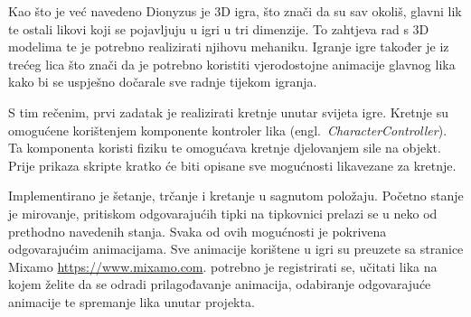 Kao što je već navedeno Dionyzus je 3D igra, što znači da su sav okoliš, glavni lik
te ostali likovi koji se pojavljuju u igri u tri dimenzije. To zahtjeva rad s 3D
modelima te je potrebno realizirati njihovu mehaniku.
Igranje igre također je iz trećeg lica što znači da je potrebno koristiti
vjerodostojne animacije glavnog lika kako bi se uspješno dočarale sve radnje tijekom
igranja. 

S tim rečenim, prvi zadatak je realizirati kretnje unutar svijeta igre. Kretnje su
omogućene korištenjem komponente kontroler lika
(engl.~\textit{CharacterController}). Ta komponenta koristi fiziku te omogućava kretnje djelovanjem sile na objekt. 
Prije prikaza skripte kratko će biti opisane sve mogućnosti likavezane za kretnje. 

Implementirano je šetanje, trčanje i kretanje u sagnutom položaju. Početno stanje je
mirovanje, pritiskom odgovarajućih tipki na tipkovnici prelazi se u neko od
prethodno navedenih stanja. Svaka od ovih mogućnosti je pokrivena odgovarajućim
animacijama. Sve animacije korištene u igri su preuzete sa stranice Mixamo
\url{https://www.mixamo.com}.
potrebno je registrirati se, učitati lika na kojem želite da se odradi
prilagođavanje animacija, odabiranje odgovarajuće animacije te spremanje lika unutar
projekta.

